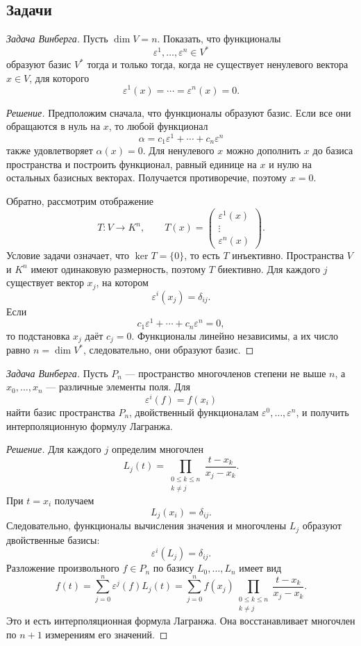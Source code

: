 \subsection*{Задачи}

\begin{problem}
\textit{Задача Винберга.}
Пусть \(\dim V=n\). Показать, что функционалы
\[
\varepsilon^1,\dots,\varepsilon^n\in V^*
\]
образуют базис \(V^*\) тогда и только тогда, когда не существует ненулевого вектора \(x\in V\), для которого
\[
\varepsilon^1(x)=\cdots=\varepsilon^n(x)=0.
\]
\end{problem}

\begin{proof}[Решение]
Предположим сначала, что функционалы образуют базис. Если все они обращаются в нуль на \(x\), то любой функционал
\[
\alpha=c_1\varepsilon^1+\cdots+c_n\varepsilon^n
\]
также удовлетворяет \(\alpha(x)=0\). Для ненулевого \(x\) можно дополнить \(x\) до базиса пространства и построить функционал, равный единице на \(x\) и нулю на остальных базисных векторах. Получается противоречие, поэтому \(x=0\).

Обратно, рассмотрим отображение
\[
T:V\to K^n,
\qquad
T(x)=
\begin{pmatrix}
\varepsilon^1(x)\\ \vdots\\ \varepsilon^n(x)
\end{pmatrix}.
\]
Условие задачи означает, что \(\ker T=\{0\}\), то есть \(T\) инъективно. Пространства \(V\) и \(K^n\) имеют одинаковую размерность, поэтому \(T\) биективно. Для каждого \(j\) существует вектор \(x_j\), на котором
\[
\varepsilon^i(x_j)=\delta_{ij}.
\]
Если
\[
c_1\varepsilon^1+\cdots+c_n\varepsilon^n=0,
\]
то подстановка \(x_j\) даёт \(c_j=0\). Функционалы линейно независимы, а их число равно \(n=\dim V^*\), следовательно, они образуют базис.
\end{proof}

\begin{problem}
\textit{Задача Винберга.}
Пусть \(P_n\) --- пространство многочленов степени не выше \(n\), а \(x_0,\dots,x_n\) --- различные элементы поля. Для
\[
\varepsilon^i(f)=f(x_i)
\]
найти базис пространства \(P_n\), двойственный функционалам \(\varepsilon^0,\dots,\varepsilon^n\), и получить интерполяционную формулу Лагранжа.
\end{problem}

\begin{proof}[Решение]
Для каждого \(j\) определим многочлен
\[
L_j(t)=
\prod_{\substack{0\leq k\leq n\\k\neq j}}
\frac{t-x_k}{x_j-x_k}.
\]
При \(t=x_i\) получаем
\[
L_j(x_i)=\delta_{ij}.
\]
Следовательно, функционалы вычисления значения и многочлены \(L_j\) образуют двойственные базисы:
\[
\varepsilon^i(L_j)=\delta_{ij}.
\]
Разложение произвольного \(f\in P_n\) по базису \(L_0,\dots,L_n\) имеет вид
\[
f(t)=\sum_{j=0}^n \varepsilon^j(f)L_j(t)
=\sum_{j=0}^n f(x_j)
\prod_{\substack{0\leq k\leq n\\k\neq j}}
\frac{t-x_k}{x_j-x_k}.
\]
Это и есть интерполяционная формула Лагранжа. Она восстанавливает многочлен по \(n+1\) измерениям его значений.
\end{proof}

